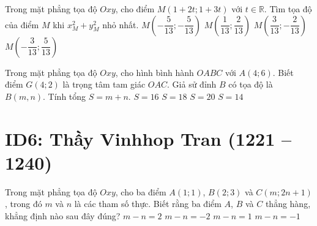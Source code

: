 \begin{ex}%
	Trong mặt phẳng tọa độ $Oxy$, cho điểm $M(1+2t;1+3t)$ với $t\in \mathbb{R}$. Tìm tọa độ của điểm $M$ khi $x^2_M+y_M^2$ nhỏ nhất.
	\choice
	{$M\left(-\dfrac{5}{13};-\dfrac{5}{13}\right)$}
	{$M\left(\dfrac{1}{13};\dfrac{2}{13}\right)$}
	{\True $M\left(\dfrac{3}{13};-\dfrac{2}{13}\right)$}
	{$M\left(-\dfrac{3}{13};\dfrac{5}{13}\right)$}
\end{ex}

\begin{ex}%
	Trong mặt phẳng tọa độ $Oxy$, cho hình bình hành $OABC$ với $A(4;6)$. Biết điểm $G(4;2)$ là trọng tâm tam giác $OAC$. Giả sử đỉnh $B$ có tọa độ là $B(m,n)$. Tính tổng $S=m+n$.
	\choice
	{$S=16$}
	{\True $S=18$}
	{$S=20$}
	{$S=14$}
\end{ex}



\section*{ID6: Thầy Vinhhop Tran (1221 -- 1240)}
	\begin{ex}%
	Trong mặt phẳng tọa độ $Oxy$, cho ba điểm $A(1;1)$, $B(2;3)$ và $C(m;2n+1)$, trong đó $m$ và $n$ là các tham số thực. Biết rằng ba điểm $A$, $B$ và $C$ thẳng hàng, khẳng định nào sau đây đúng?
	\choice
	{$m-n=2$}
	{$m-n=-2$}
	{\True $m-n=1$}
	{$m-n=-1$}
\end{ex}

